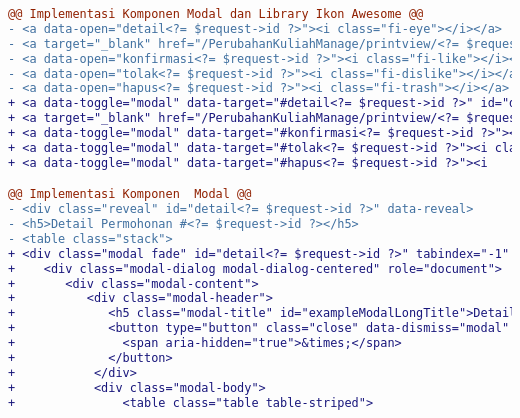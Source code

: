 \begin{lstlisting}[language=diff, caption=Perubahan file \path{\views\PerubahanKuliahManage\main.php}, label=Entri, basicstyle=\ttfamily, frame=single,
columns=fullflexible, keepspaces=true, breaklines=true]
@@ Implementasi Komponen Modal dan Library Ikon Awesome @@
- <a data-open="detail<?= $request->id ?>"><i class="fi-eye"></i></a>
- <a target="_blank" href="/PerubahanKuliahManage/printview/<?= $request->id ?>"><i class="fi-print"></i></a>
- <a data-open="konfirmasi<?= $request->id ?>"><i class="fi-like"></i></a>                                    
- <a data-open="tolak<?= $request->id ?>"><i class="fi-dislike"></i></a>
- <a data-open="hapus<?= $request->id ?>"><i class="fi-trash"></i></a>
+ <a data-toggle="modal" data-target="#detail<?= $request->id ?>" id="detailIkon<?= $request->id ?>"><i class="fas fa-eye blueiconcolor"></i></a>
+ <a target="_blank" href="/PerubahanKuliahManage/printview/<?= $request->id ?>"><i class="fas fa-print"></i></a>
+ <a data-toggle="modal" data-target="#konfirmasi<?= $request->id ?>"><i class="fas fa-thumbs-up"></i></a>
+ <a data-toggle="modal" data-target="#tolak<?= $request->id ?>"><i class="fas fa-thumbs-down"></i></a>
+ <a data-toggle="modal" data-target="#hapus<?= $request->id ?>"><i 

@@ Implementasi Komponen  Modal @@
- <div class="reveal" id="detail<?= $request->id ?>" data-reveal>
- <h5>Detail Permohonan #<?= $request->id ?></h5>
- <table class="stack">
+ <div class="modal fade" id="detail<?= $request->id ?>" tabindex="-1" role="dialog" aria-hidden="true">
+    <div class="modal-dialog modal-dialog-centered" role="document">
+       <div class="modal-content">
+          <div class="modal-header">
+             <h5 class="modal-title" id="exampleModalLongTitle">Detail Permohonan #<?= $request->id ?></h5>
+             <button type="button" class="close" data-dismiss="modal" aria-label="Close">
+               <span aria-hidden="true">&times;</span>
+             </button>
+           </div>
+           <div class="modal-body">
+               <table class="table table-striped">


\end{lstlisting}
